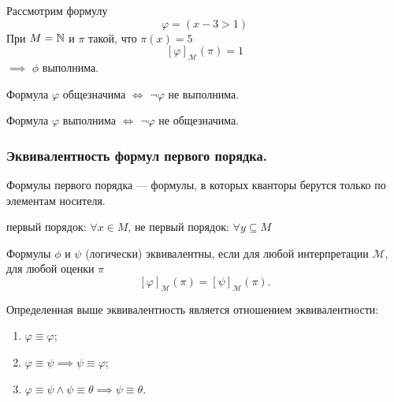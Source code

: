 \documentclass[a4paper, fleqn]{article}
\begin{document}
    \begin{example}
        Рассмотрим формулу
        \[
            \varphi = (x - 3 > 1)
        \]
        При $M = \mathbb{N}$ и $\pi$ такой, что $\pi(x) = 5$ 
        \[
            [\varphi]_{\mathcal{M}}(\pi) = 1
        \] 
        $\implies$ $\phi$ выполнима.
    \end{example}
        
    \begin{lemma}
        Формула $\varphi$ общезначима $\iff$ $\neg \varphi$ не выполнима.
    \end{lemma}

    \begin{lemma}
        Формула $\varphi$ выполнима $\iff$ $\neg \varphi$ не общезначима.
    \end{lemma}

    \subsubsection{Эквивалентность формул первого порядка.}

    Формулы первого порядка --- формулы, в которых кванторы берутся только по элементам 
    носителя.
    \begin{example}
        первый порядок: $\forall x \in M$, 
        не первый порядок: $\forall y \subseteq M$
    \end{example}

    \begin{definition}
        Формулы $\phi$ и $\psi$ (логически) эквивалентны, если для любой интерпретации
        $\mathcal{M}$, для любой оценки $\pi$
        \[
            [\varphi]_{\mathcal{M}}(\pi) = [\psi]_{\mathcal{M}}(\pi).
        \]
    \end{definition}

    \begin{lemma}
        Определенная выше эквивалентность является отношением эквивалентности:
        \begin{enumerate}[topsep=0pt]
            \item $\varphi \equiv \varphi$;
            \item $\varphi \equiv \psi \implies \psi \equiv \varphi$;
            \item $\varphi \equiv \psi \land \psi \equiv \theta \implies \psi \equiv \theta$.
        \end{enumerate}
    \end{lemma}
\end{document}
